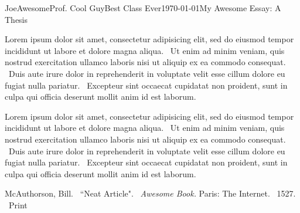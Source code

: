 \documentclass[12pt,letterpaper]{article}
\begin{document}
\begin{mla}{Joe}{Awesome}{Prof. Cool Guy}{Best Class Ever}{\mladate\today}{My Awesome Essay: A Thesis}

Lorem ipsum dolor sit amet, consectetur adipisicing elit, sed do eiusmod tempor incididunt ut labore et dolore magna aliqua. \ Ut enim ad minim veniam, quis nostrud exercitation ullamco laboris nisi ut aliquip ex ea commodo consequat. \ Duis aute irure dolor in reprehenderit in voluptate velit esse cillum dolore eu fugiat nulla pariatur. \ Excepteur sint occaecat cupidatat non proident, sunt in culpa qui officia deserunt mollit anim id est laborum.

Lorem ipsum dolor sit amet, consectetur adipisicing elit, sed do eiusmod tempor incididunt ut labore et dolore magna aliqua. \ Ut enim ad minim veniam, quis nostrud exercitation ullamco laboris nisi ut aliquip ex ea commodo consequat. \ Duis aute irure dolor in reprehenderit in voluptate velit esse cillum dolore eu fugiat nulla pariatur. \ Excepteur sint occaecat cupidatat non proident, sunt in culpa qui officia deserunt mollit anim id est laborum.

\begin{workscited}
%
\bibent
McAuthorson, Bill. \ ``Neat Article". \ \textit{Awesome Book.} Paris: The Internet. \ 1527. \ Print

\end{workscited}
\end{mla}
\end{document}
